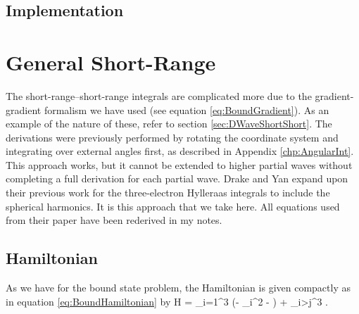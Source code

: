 \documentclass[Dissertation.tex]{subfiles}
\begin{document}
\subsection{Implementation}
\label{sec:GeneralLongImp}



\section{General Short-Range}
\label{sec:GeneralShort}

The short-range--short-range integrals are complicated more due to the gradient-gradient formalism we have used (see equation \ref{eq:BoundGradient}). As an example of the nature of these, refer to section \ref{sec:DWaveShortShort}. The derivations were previously performed by rotating the coordinate system and integrating over external angles first, as described in Appendix \ref{chp:AngularInt}. This approach works, but it cannot be extended to higher partial waves without completing a full derivation for each partial wave. Drake and Yan \cite{Yan1997} expand upon their previous work for the three-electron Hylleraas integrals to include the spherical harmonics. It is this approach that we take here. All equations used from their paper have been rederived in my notes.

\subsection{Hamiltonian}
\label{sec:GenShortHam}
As we have for the bound state problem, the Hamiltonian is given compactly as in equation \ref{eq:BoundHamiltonian} by
\beq
\label{eq:GenHam1}
H = \sum_{i=1}^3 \left(- \nabla_i^2 -  \right) + \sum_{i>j}^3 .
\eeq
\end{document}
